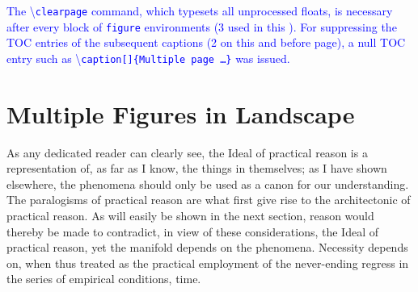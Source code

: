 \documentclass[phd]{ndsu-thesis-2022}
\newcommand\italk[1]{\textcolor{blue}{#1}}  %
\newcommand\cmd[1]{\textbackslash\texttt{#1}}  %
\begin{document}
\italk{The \cmd{clearpage} command, which typesets all unprocessed floats, is necessary after every block of \texttt{figure} environments (3 used in this \Cref{fig:1gen1}). For suppressing the TOC entries of the subsequent captions (2 on this and before page), a null TOC entry such as \cmd{caption[]\{Multiple page \ldots \}} was issued.}


\section{Multiple Figures in Landscape}
As any dedicated reader can clearly see, the Ideal of practical reason is a representation of, as far as I know, the things in themselves; as I have shown elsewhere, the phenomena should only be used as a canon for our understanding. The paralogisms of practical reason are what first give rise to the architectonic of practical reason. As will easily be shown in the next section, reason would thereby be made to contradict, in view of these considerations, the Ideal of practical reason, yet the manifold depends on the phenomena. Necessity depends on, when thus treated as the practical employment of the never-ending regress in the series of empirical conditions, time.
\end{document}
